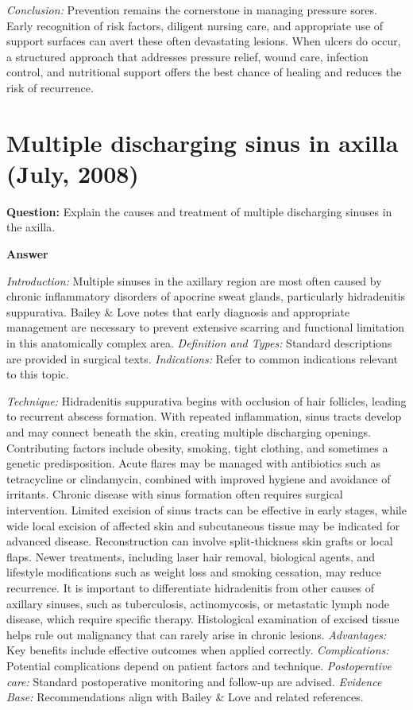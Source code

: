 \documentclass{article}
\begin{document}
\emph{Conclusion:} Prevention remains the cornerstone in managing pressure sores. Early recognition of risk factors, diligent nursing care, and appropriate use of support surfaces can avert these often devastating lesions. When ulcers do occur, a structured approach that addresses pressure relief, wound care, infection control, and nutritional support offers the best chance of healing and reduces the risk of recurrence.


\section{Multiple discharging sinus in axilla (July, 2008)}

\textbf{Question:} Explain the causes and treatment of multiple discharging sinuses in the axilla.

\textbf{Answer}

\emph{Introduction:} Multiple sinuses in the axillary region are most often caused by chronic inflammatory disorders of apocrine sweat glands, particularly hidradenitis suppurativa. Bailey \& Love notes that early diagnosis and appropriate management are necessary to prevent extensive scarring and functional limitation in this anatomically complex area.
\emph{Definition and Types:} Standard descriptions are provided in surgical texts.
\emph{Indications:} Refer to common indications relevant to this topic.

\emph{Technique:} Hidradenitis suppurativa begins with occlusion of hair follicles, leading to recurrent abscess formation. With repeated inflammation, sinus tracts develop and may connect beneath the skin, creating multiple discharging openings. Contributing factors include obesity, smoking, tight clothing, and sometimes a genetic predisposition. Acute flares may be managed with antibiotics such as tetracycline or clindamycin, combined with improved hygiene and avoidance of irritants. Chronic disease with sinus formation often requires surgical intervention. Limited excision of sinus tracts can be effective in early stages, while wide local excision of affected skin and subcutaneous tissue may be indicated for advanced disease. Reconstruction can involve split-thickness skin grafts or local flaps. Newer treatments, including laser hair removal, biological agents, and lifestyle modifications such as weight loss and smoking cessation, may reduce recurrence. It is important to differentiate hidradenitis from other causes of axillary sinuses, such as tuberculosis, actinomycosis, or metastatic lymph node disease, which require specific therapy. Histological examination of excised tissue helps rule out malignancy that can rarely arise in chronic lesions.
\emph{Advantages:} Key benefits include effective outcomes when applied correctly.
\emph{Complications:} Potential complications depend on patient factors and technique.
\emph{Postoperative care:} Standard postoperative monitoring and follow-up are advised.
\emph{Evidence Base:} Recommendations align with Bailey \& Love and related references.
\end{document}
